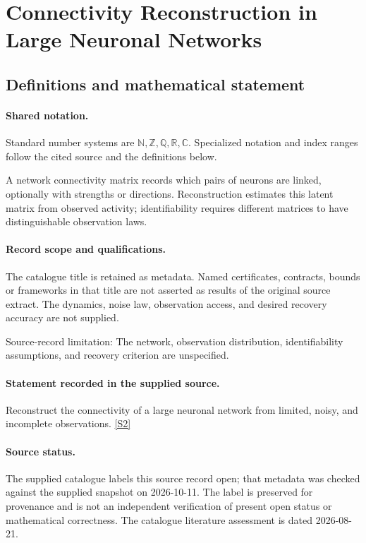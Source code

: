 \documentclass[11pt]{article}
\newcommand{\sref}[2]{\hyperlink{source:#1:#2}{[S#2]}}
\begin{document}
\section{Connectivity Reconstruction in Large Neuronal Networks}\label{statement}

\subsection{Definitions and mathematical statement}

\paragraph{Shared notation.}Standard number systems are $\mathbb N,\mathbb Z,\mathbb Q,\mathbb R,\mathbb C$. Specialized notation and index ranges follow the cited source and the definitions below.


A network connectivity matrix records which pairs of neurons are linked, optionally with strengths or directions. Reconstruction estimates this latent matrix from observed activity; identifiability requires different matrices to have distinguishable observation laws.
\paragraph{Record scope and qualifications.}
The catalogue title is retained as metadata. Named certificates, contracts, bounds or frameworks in that title are not asserted as results of the original source extract.
The dynamics, noise law, observation access, and desired recovery accuracy are not supplied.

Source-record limitation: The network, observation distribution, identifiability assumptions, and recovery criterion are unspecified.
\paragraph{Statement recorded in the supplied source.}
Reconstruct the connectivity of a large neuronal network from limited, noisy, and incomplete observations. \sref{statement}{2}
\paragraph{Source status.}
The supplied catalogue labels this source record open; that metadata was checked against the supplied snapshot on 2026-10-11. The label is preserved for provenance and is not an independent verification of present open status or mathematical correctness. The catalogue literature assessment is dated 2026-08-21.
\end{document}
